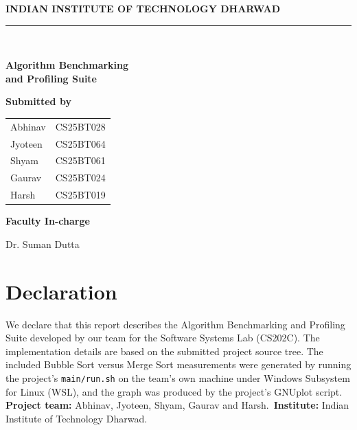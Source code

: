 \documentclass[12pt,a4paper,oneside]{report}
\begin{document}
\begin{titlepage}
\centering
\vspace*{1.0cm}
{\Large\bfseries INDIAN INSTITUTE OF TECHNOLOGY DHARWAD\par}
\vspace{0.25cm}{\large Software Systems Lab \;|\; CS202C\par}
\vspace{1.7cm}
{\color{blue}\rule{\linewidth}{1.5pt}}\\[0.5cm]
{\Huge\bfseries\color{navy} Algorithm Benchmarking\\[0.15cm] and Profiling Suite\par}
\vspace{0.45cm}{\Large Project Report\par}
\vspace{0.5cm}{\color{blue}\rule{\linewidth}{1.5pt}}
\vspace{1.3cm}
{\large\bfseries Submitted by\par}\vspace{0.35cm}
\begin{tabular}{ll}
Abhinav & CS25BT028\\
Jyoteen & CS25BT064\\
Shyam & CS25BT061\\
Gaurav & CS25BT024\\
Harsh & CS25BT019
\end{tabular}
\vfill
{\large\bfseries Faculty In-charge\par}\vspace{0.15cm}
{\Large Dr. Suman Dutta\par}
\vspace{0.8cm}{\large Academic Project Submission\par}
\vspace{0.4cm}{\large November 2026\par}
\end{titlepage}
\chapter*{Declaration}
We declare that this report describes the Algorithm Benchmarking and Profiling Suite developed by our team for the Software Systems Lab (CS202C). The implementation details are based on the submitted project source tree. The included Bubble Sort versus Merge Sort measurements were generated by running the project's \texttt{main/run.sh} on the team's own machine under Windows Subsystem for Linux (WSL), and the graph was produced by the project's GNUplot script.
\vspace{1cm}\textbf{Project team:} Abhinav, Jyoteen, Shyam, Gaurav and Harsh.\
\textbf{Institute:} Indian Institute of Technology Dharwad.
\end{document}
